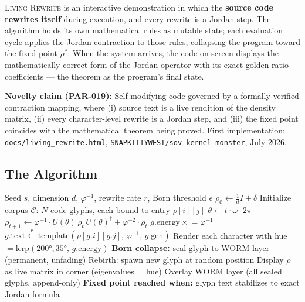 \documentclass[12pt, letterpaper]{article}
\theoremstyle{plain}
\theoremstyle{definition}
\theoremstyle{remark}
\newcommand{\phiinv}{\varphi^{-1}}
\newcommand{\phiinvsq}{\varphi^{-2}}
\newcommand{\novel}[1]{\textcolor{SovOrange}{\textsc{#1}}}
\begin{document}
\novel{Living Rewrite} is an interactive demonstration in which the \textbf{source code
rewrites itself} during execution, and every rewrite is a Jordan step.
The algorithm holds its own mathematical rules as mutable state; each evaluation
cycle applies the Jordan contraction to those rules, collapsing the program toward
the fixed point $\rho^*$. When the system arrives, the code on screen displays the
mathematically correct form of the Jordan operator with its exact golden-ratio
coefficients --- the theorem as the program's final state.

\begin{priorartbox}
\textbf{Novelty claim (PAR-019):} Self-modifying code governed by a formally
verified contraction mapping, where (i) source text is a live rendition of the
density matrix, (ii) every character-level rewrite is a Jordan step, and
(iii) the fixed point coincides with the mathematical theorem being proved.
First implementation: \texttt{docs/living\_rewrite.html},
\texttt{SNAPKITTYWEST/sov-kernel-monster}, July 2026.
\end{priorartbox}

\subsection{The Algorithm}

\begin{algobox}[title={Algorithm: Living Rewrite --- Self-Modifying Jordan Code}]
\begin{algorithmic}[1]
\Require Seed $s$, dimension $d$, $\phiinv$, rewrite rate $r$, Born threshold $\epsilon$
\State $\rho_0 \leftarrow \frac{1}{d} I + \delta$ 
\State Initialize corpus $\mathcal{C}$: $N$ code-glyphs, each bound to entry $\rho[i][j]$
  \State $\theta \leftarrow t \cdot \omega \cdot 2\pi$ 
  \State $\rho_{t+1} \leftarrow \phiinv \cdot U(\theta)\,\rho_t\,U(\theta)^\dagger + \phiinvsq \cdot \rho_t$
    \State $g.\text{energy} \mathrel{\times}= \phiinv$ 
    \State $g.\text{text} \xleftarrow{r} \text{template}(\rho[g.i][g.j],\, \phiinv,\, g.\text{gen})$
    \State Render each character with hue $= \text{lerp}(200°, 35°,\, g.\text{energy})$
      \State \textbf{Born collapse:} seal glyph to WORM layer (permanent, unfading)
      \State Rebirth: spawn new glyph at random position
    \EndIf
  \EndFor
  \State Display $\rho$ as live matrix in corner (eigenvalues = hue)
  \State Overlay WORM layer (all sealed glyphs, append-only)
\EndLoop
\State \textbf{Fixed point reached when:} glyph text stabilizes to exact Jordan formula
\end{algorithmic}
\end{algobox}
\end{document}
